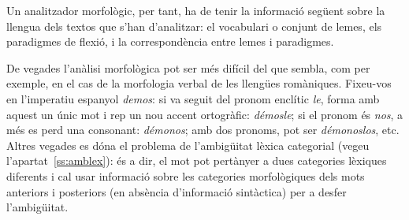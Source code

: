 Un analitzador morfològic, per tant, ha de tenir la informació
següent sobre la llengua dels textos que s'han d'analitzar:
el vocabulari o conjunt de lemes, els paradigmes de
flexió, i la correspondència entre lemes i paradigmes.

De vegades l'anàlisi morfològica pot ser més difícil del que sembla,
com per exemple, en el cas de la morfologia verbal de les llengües
romàniques. Fixeu-vos en l'imperatiu espanyol \emph{demos}: si va
seguit del pronom enclític \emph{le}, forma amb aquest un únic mot i
rep un nou accent ortogràfic: \emph{démosle}; si el pronom és
\emph{nos}, a més es perd una consonant: \emph{démonos}; amb dos
pronoms, pot ser {\em démonoslos}, etc.  Altres vegades es dóna el
problema de l'ambigüitat lèxica categorial (vegeu
l'apartat~\ref{ss:amblex}): és a dir, el mot pot pertànyer a dues
categories lèxiques diferents i cal usar informació sobre les
categories morfològiques dels mots anteriors i posteriors (en absència
d'informació sintàctica) per a desfer l'ambigüitat.

